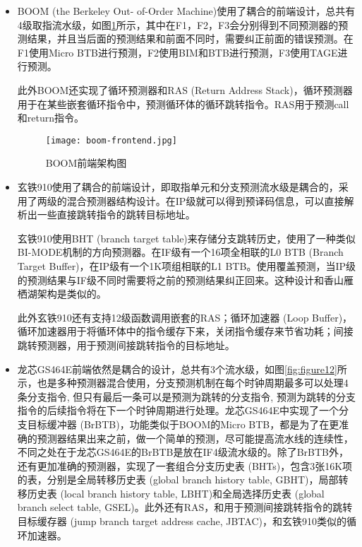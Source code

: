 \begin{itemize}[listparindent=2em]
	\item BOOM (the Berkeley Out-
    of-Order Machine)\cite{boom-spec, sonic-boom}使用了耦合的前端设计，总共有4级取指流水级，如图\ref{fig:figure11}所示，其中在F1，F2，F3会分别得到不同预测器的预测结果，并且当后面的预测结果和前面不同时，需要纠正前面的错误预测。在F1使用Micro BTB进行预测，F2使用BIM和BTB进行预测，F3使用TAGE进行预测。
    
    此外BOOM还实现了循环预测器和RAS (Return Address Stack)，循环预测器用于在某些嵌套循环指令中，预测循环体的循环跳转指令。RAS用于预测call和return指令。

    \begin{figure}[htb]
        \centering
        \setlength\tabcolsep{3pt}  %
        \vspace{5pt} %
        \texttt{[image: boom-frontend.jpg]}
        \caption{BOOM前端架构图\cite{boom-frontend}}
        \label{fig:figure11}
    \end{figure}

	\item 玄铁910\cite{xuantie}使用了耦合的前端设计，即取指单元和分支预测流水级是耦合的，采用了两级的混合预测器结构设计。在IP级就可以得到预译码信息，可以直接解析出一些直接跳转指令的跳转目标地址。

    玄铁910使用BHT (branch target table)来存储分支跳转历史，使用了一种类似BI-MODE\cite{bi-mode}机制的方向预测器。在IF级有一个16项全相联的L0 BTB (Branch Target Buffer)，在IP级有一个1K项组相联的L1 BTB。使用覆盖预测，当IP级的预测结果与IF级不同时需要将之前的预测结果纠正回来。这种设计和香山雁栖湖架构是类似的。

    此外玄铁910还有支持12级函数调用嵌套的RAS；循环加速器 (Loop Buffer)，循环加速器用于将循环体中的指令缓存下来，关闭指令缓存来节省功耗；间接跳转预测器，用于预测间接跳转指令的目标地址。

    \item 龙芯GS464E\cite{loongson}前端依然是耦合的设计，总共有3个流水级，如图\ref{fig:figure12}所示，也是多种预测器混合使用，分支预测机制在每个时钟周期最多可以处理4条分支指令, 但只有最后一条可以是预测为跳转的分支指令, 预测为跳转的分支指令的后续指令将在下一个时钟周期进行处理。龙芯GS464E中实现了一个分支目标缓冲器 (BrBTB)，功能类似于BOOM的Micro BTB，都是为了在更准确的预测器结果出来之前，做一个简单的预测，尽可能提高流水线的连续性，不同之处在于龙芯GS464E的BrBTB是放在IF4级流水级的。除了BrBTB外，还有更加准确的预测器，实现了一套组合分支历史表 (BHTs)，包含3张16K项的表，分别是全局转移历史表 (global branch history table, GBHT)，局部转移历史表 (local branch history table, LBHT)和全局选择历史表 (global branch select table, GSEL)。此外还有RAS，和用于预测间接跳转指令的跳转目标缓存器 (jump branch target address cache, JBTAC)，和玄铁910类似的循环加速器。
    

\end{itemize}
